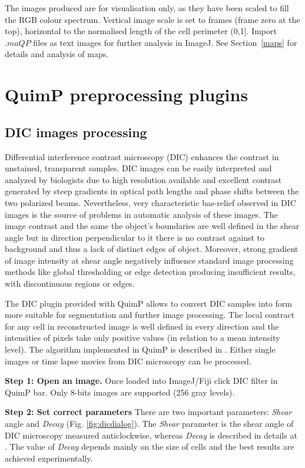 \documentclass[a4paper,12pt]{article}
\begin{document}
The images produced are for visualisation only, as they have been scaled to fill the RGB colour spectrum.
Vertical image scale is set to frames (frame zero at the top),
horizontal to the normalised length of the cell perimeter (0,1].
Import $.maQP$ files as text images for further analysis in ImageJ. See Section~\ref{maps} for details
and analysis of maps.

\section{QuimP preprocessing plugins}
\label{sec:QuimP_preplugins}
\subsection{DIC images processing}
\label{sec:DIC}

Differential interference contrast microscopy (DIC) enhances the contrast in unstained, transparent samples. DIC images can be easily interpreted and analyzed by biologists due to high resolution available and excellent contrast generated by steep gradients in optical path lengths and phase shifts between the two polarized beams. Nevertheless, very characteristic bas-relief observed in DIC images is the source of problems in automatic analysis of these images. The image contrast and the same the object’s boundaries are well defined in the shear angle but in direction perpendicular to it there is no contrast against to background and thus a lack of distinct edges of object. Moreover, strong gradient of image intensity at shear angle negatively influence standard image processing methods like global thresholding or edge detection producing insufficient results, with discontinuous regions or edges.

The DIC plugin provided with QuimP allows to convert DIC samples into form more suitable for segmentation and further image processing. The local contract for any cell in reconstructed image is well defined in every direction and the intensities of pixels take only positive values (in relation to a mean intensity level). The algorithm implemented in QuimP is described in \cite{Kam1998}. Either single images or time lapse movies from DIC microscopy can be processed. 

\textbf{Step 1: Open an image.}
Once loaded into ImageJ/Fiji click DIC filter in QuimP bar. Only 8-bits images are supported (256 gray levels).

\textbf{Step 2: Set correct parameters}
There are two important parameters: \textit{Shear} angle and \textit{Decay} (Fig. \ref{fig:dicdialog}). The \textit{Shear} parameter is the shear angle of DIC microscopy measured anticlockwise, whereas \textit{Decay} is described in details at \cite{Kam1998}. The value of \textit{Decay} depends mainly on the size of cells and the best results are achieved experimentally. 
   
\end{document}
